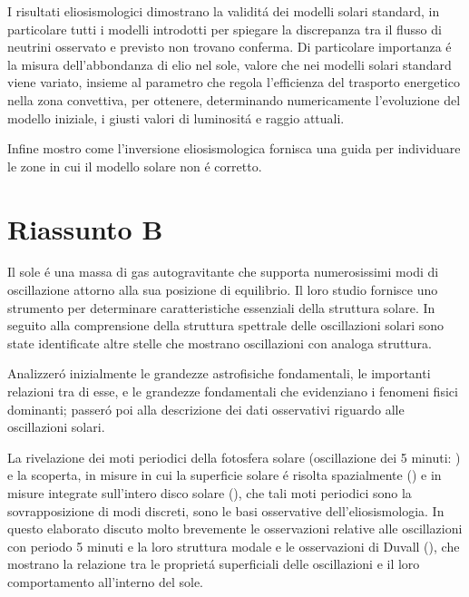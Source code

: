 \documentclass[oneside,12pt,fleqn]{memoir}
\begin{document}
I risultati eliosismologici dimostrano la validit\'a dei modelli solari standard, in particolare tutti i modelli introdotti per spiegare la discrepanza tra il flusso di neutrini osservato e previsto non trovano conferma. Di particolare importanza \'e la  misura  dell'abbondanza di elio nel sole, valore che nei modelli solari standard viene variato, insieme al parametro che regola l'efficienza del trasporto energetico nella zona convettiva, per ottenere, determinando numericamente l'evoluzione del modello iniziale, i giusti valori di luminosit\'a e raggio attuali.

Infine mostro come l'inversione eliosismologica fornisca una guida per individuare le zone in cui il modello solare non \'e corretto.

 
\printbibliography[heading=subbibintoc]



\section{Riassunto B}


Il sole \'e una massa di gas autogravitante che supporta numerosissimi modi di oscillazione attorno alla sua posizione di equilibrio. Il loro studio fornisce uno strumento per determinare caratteristiche essenziali della struttura solare. In seguito alla comprensione della struttura spettrale delle oscillazioni solari sono state identificate altre stelle che mostrano oscillazioni con analoga struttura.

Analizzer\'o inizialmente le grandezze astrofisiche fondamentali, le importanti relazioni tra di esse, e le grandezze fondamentali che evidenziano i fenomeni fisici dominanti; passer\'o poi alla descrizione dei dati osservativi riguardo alle oscillazioni solari.

La rivelazione dei moti periodici della fotosfera solare (oscillazione dei 5 minuti: \cite{lei62velocity}) e la scoperta, in misure in cui la superficie solare \'e risolta spazialmente (\cite{deu75observations}) e in misure integrate sull'intero disco solare (\cite{cla79solar}), che tali moti periodici sono la sovrapposizione di modi discreti, sono le basi osservative dell'eliosismologia. 
In questo elaborato discuto molto brevemente le osservazioni relative  alle oscillazioni con periodo 5 minuti e la loro struttura modale e le osservazioni di Duvall (\cite{duv82dispersion}), che mostrano la relazione tra le propriet\'a superficiali delle oscillazioni e il loro comportamento all'interno del sole.
\end{document}
